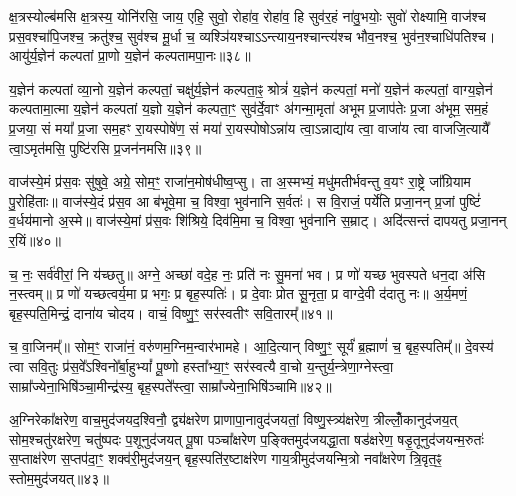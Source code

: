 {\anuvakamend[{स्क॒भ्नी॒त॒ यु॒य॒व॒न्पि॒तरा॒ द्विच॑त्वारिꣳशच्च॥८॥}]}

क्ष॒त्रस्योल्ब॑मसि क्ष॒त्रस्य॒ योनि॑रसि॒ जाय॒ एहि॒ सुवो॒ रोहा॑व॒ रोहा॑व॒ हि सुव॑र॒हं ना॑वु॒भयोः॒ सुवो॑ रोक्ष्यामि॒ वाज॑श्च प्रस॒वश्चा॑पि॒जश्च॒ क्रतु॑श्च॒ सुव॑श्च मू॒र्धा च॒ व्यश्ञि॑यश्चा\-ऽ\-ऽन्त्याय॒नश्चान्त्य॑श्च भौव॒नश्च॒ भुव॑न॒श्चाधि॑पतिश्च। आयु॑र्य॒ज्ञेन॑ कल्पतां प्रा॒णो य॒ज्ञेन॑ कल्पतामपा॒नः॥३८॥

य॒ज्ञेन॑ कल्पतां व्या॒नो य॒ज्ञेन॑ कल्पतां॒ चक्षु॑र्य॒ज्ञेन॑ कल्पता॒ꣴ॒ श्रोत्रं॑ य॒ज्ञेन॑ कल्पतां॒ मनो॑ य॒ज्ञेन॑ कल्पतां॒ वाग्य॒ज्ञेन॑ कल्पतामा॒त्मा य॒ज्ञेन॑ कल्पतां य॒ज्ञो य॒ज्ञेन॑ कल्पता॒ꣳ॒ सुव॑र्दे॒वाꣳ अ॑गन्मा॒मृता॑ अभूम प्र॒जाप॑तेः प्र॒जा अ॑भूम॒ सम॒हं प्र॒जया॒ सं मया᳚ प्र॒जा सम॒हꣳ रा॒यस्पोषे॑ण॒ सं मया॑ रा॒यस्पोषो\-ऽन्ना॑य त्वा॒\-ऽन्नाद्या॑य त्वा॒ वाजा॑य त्वा वाजजि॒त्यायै᳚ त्वा॒\-ऽमृत॑मसि॒ पुष्टि॑रसि प्र॒जन॑नमसि॥३९॥

{\anuvakamend[{अ॒पा॒नो वाजा॑य॒ नव॑ च॥९॥}]}

वाज॑स्ये॒मं प्र॑स॒वः सु॑षुवे॒ अग्रे॒ सोम॒ꣳ॒ राजा॑न॒मोष॑धीष्व॒प्सु। ता अ॒स्मभ्यं॒ मधु॑मतीर्भवन्तु व॒यꣳ रा॒ष्ट्रे जा᳚ग्रियाम पु॒रोहि॑ताः॥ वाज॑स्ये॒दं प्र॑स॒व आ ब॑भूवे॒मा च॒ विश्वा॒ भुव॑नानि स॒र्वतः॑। स वि॒राजं॒ पर्ये॑ति प्रजा॒नन् प्र॒जां पुष्टिं॑ व॒र्धय॑मानो अ॒स्मे॥ वाज॑स्ये॒मां प्र॑स॒वः शि॑श्रिये॒ दिव॑मि॒मा च॒ विश्वा॒ भुव॑नानि स॒म्राट्। अदि॑त्सन्तं दापयतु प्रजा॒नन् र॒यिं॥४०॥

च॒ नः॒ सर्व॑वीरां॒ नि य॑च्छतु॥ अग्ने॒ अच्छा॑ वदे॒ह नः॒ प्रति॑ नः सु॒मना॑ भव। प्र णो॑ यच्छ भुवस्पते धन॒दा अ॑सि न॒स्त्वम्॥ प्र णो॑ यच्छत्वर्य॒मा प्र भगः॒ प्र बृह॒स्पतिः॑। प्र दे॒वाः प्रोत सू॒नृता॒ प्र वाग्दे॒वी द॑दातु नः॥ अ॒र्य॒मणं॒ बृह॒स्पति॒मिन्द्रं॒ दाना॑य चोदय। वाचं॒ विष्णु॒ꣳ॒ सर॑स्वतीꣳ सवि॒तारम्᳚॥४१॥

च॒ वा॒जिनम्᳚॥ सोम॒ꣳ॒ राजा॑नं॒ वरु॑णम॒ग्निम॒न्वार॑भामहे। आ॒दि॒त्यान् विष्णु॒ꣳ॒ सूर्यं॑ ब्र॒ह्माणं॑ च॒ बृह॒स्पतिम्᳚॥ दे॒वस्य॑ त्वा सवि॒तुः प्र॑स॒वे᳚\-ऽश्विनो᳚र्बा॒हु\-भ्यां᳚ पू॒ष्णो हस्ता᳚भ्या॒ꣳ॒ सर॑स्वत्यै वा॒चो य॒न्तुर्य॒न्त्रेणा॒ग्नेस्त्वा॒ साम्रा᳚ज्येना॒भिषि॑ञ्चा॒मीन्द्र॑स्य॒ बृह॒स्पते᳚स्त्वा॒ साम्रा᳚ज्येना॒भिषि॑ञ्चामि॥४२॥

{\anuvakamend[{र॒यिꣳ स॑वि॒तार॒ꣳ॒ षट्त्रिꣳ॑शच्च॥10॥}]}

अ॒ग्निरेका᳚क्षरेण॒ वाच॒मुद॑जयद॒श्विनौ॒ द्व्य॑क्षरेण प्राणापा॒नावुद॑जयतां॒ विष्णु॒स्त्र्य॑क्षरेण॒ त्रील्लोँ॒कानुद॑जय॒त् सोम॒श्चतु॑रक्षरेण॒ चतु॑ष्पदः प॒शूनुद॑जयत् पू॒षा पञ्चा᳚क्षरेण प॒ङ्क्तिमुद॑जयद्धा॒ता षड॑क्षरेण॒ षडृ॒तूनुद॑जयन्म॒रुतः॑ स॒प्ताक्ष॑रेण स॒प्तप॑दा॒ꣳ॒ शक्व॑री॒मुद॑जय॒न् बृह॒स्पति॑र॒ष्टाक्ष॑रेण गाय॒त्रीमुद॑जयन्मि॒त्रो नवा᳚क्षरेण त्रि॒वृत॒ꣴ॒ स्तोम॒मुद॑जयत्॥४३॥

